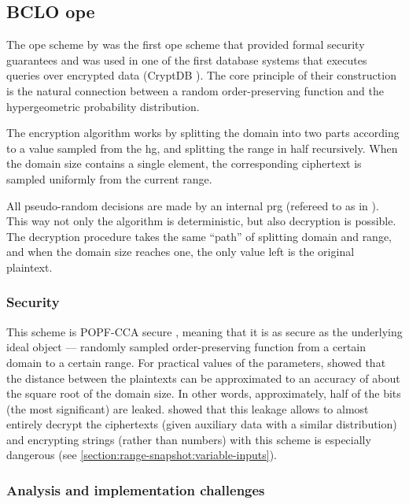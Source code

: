 \subsection{BCLO \texorpdfstring{\acrshort{ope}}{OPE} \texorpdfstring{\cite{bclo-ope}}{}}

	The \acrshort{ope} scheme by \textcite{bclo-ope} was the first \acrshort{ope} scheme that provided formal security guarantees and was used in one of the first database systems that executes queries over encrypted data (CryptDB \cite{crypt-db}).
 	The core principle of their construction is the natural connection between a random order-preserving function and the hypergeometric probability distribution.

	The encryption algorithm works by splitting the domain into two parts according to a value sampled from the \acrfull{hg}, and splitting the range in half recursively.
	When the domain size contains a single element, the corresponding ciphertext is sampled uniformly from the current range.

	All pseudo-random decisions are made by an internal \acrshort{prg} (refereed to as  in \cite{bclo-ope}).
	This way not only the algorithm is deterministic, but also decryption is possible.
	The decryption procedure takes the same ``path'' of splitting domain and range, and when the domain size reaches one, the only value left is the original plaintext.

	\subsubsection{Security}
		This scheme is POPF-CCA secure \cite{bclo-ope}, meaning that it is as secure as the underlying ideal object --- randomly sampled order-preserving function from a certain domain to a certain range.
		For practical values of the parameters, \textcite{ope-leakage} showed that the distance between the plaintexts can be approximated to an accuracy of about the square root of the domain size.
		In other words, approximately, half of the bits (the most significant) are leaked.
		\textcite{leakage-abuse-grubs-2017} showed that this leakage allows to almost entirely decrypt the ciphertexts (given auxiliary data with a similar distribution) and encrypting strings (rather than numbers) with this scheme is especially dangerous (see \cref{section:range-snapshot:variable-inputs}).

	\subsubsection{Analysis and implementation challenges}

